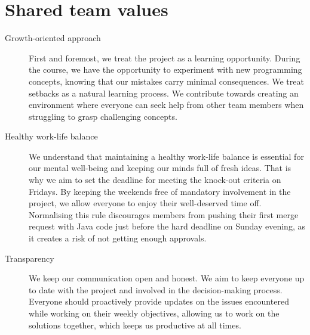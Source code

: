 \section{Shared team values}

\begin{description}
\item [Growth-oriented approach] First and foremost, we treat the project as a learning opportunity.
During the course, we have the opportunity to experiment with new programming concepts, knowing that our mistakes carry minimal consequences.
We treat setbacks as a natural learning process.
We contribute towards creating an environment where everyone can seek help from other team members when struggling to grasp challenging concepts.
\item [Healthy work-life balance] We understand that maintaining a healthy work-life balance is essential for our mental well-being and keeping our minds full of fresh ideas.
That is why we aim to set the deadline for meeting the knock-out criteria on Fridays.
By keeping the weekends free of mandatory involvement in the project, we allow everyone to enjoy their well-deserved time off.
Normalising this rule discourages members from pushing their first merge request with Java code just before the hard deadline on Sunday evening, as it creates a risk of not getting enough approvals.
\item [Transparency] We keep our communication open and honest.
We aim to keep everyone up to date with the project and involved in the decision-making process.
Everyone should proactively provide updates on the issues encountered while working on their weekly objectives, allowing us to work on the solutions together, which keeps us productive at all times.
\end{description}

